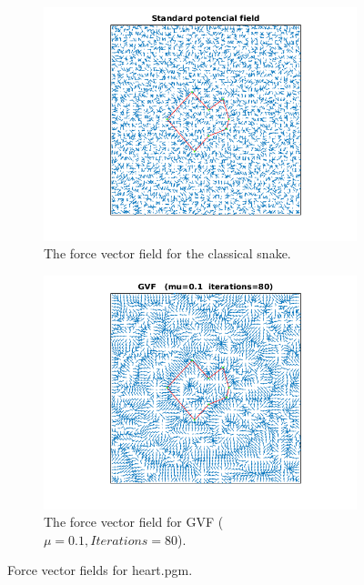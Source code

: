 \documentclass{article}
\begin{document}
\begin{figure}[h!]
\centering
\begin{subfigure}{0.49\textwidth}
  \centering
  \includegraphics[width=\linewidth]{fig7a.png}
  \caption{The force vector field for the classical snake.}
  \label{fig7a}
\end{subfigure}
\begin{subfigure}{0.49\textwidth}
  \centering
  \includegraphics[width=\linewidth]{fig7b.png}
  \caption{The force vector field for GVF ($\mu = 0.1, Iterations=80$).}
  \label{fig7b}
\end{subfigure}
\caption{Force vector fields for heart.pgm.}
\end{figure}
\end{document}
